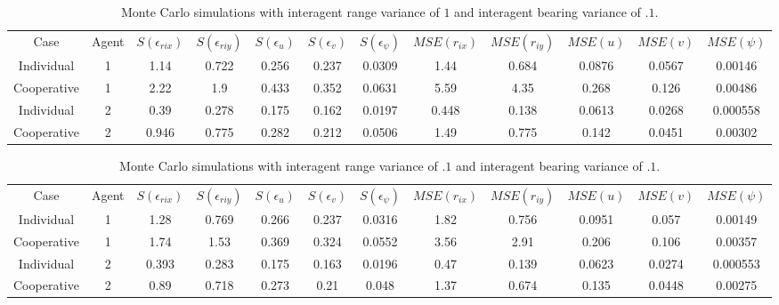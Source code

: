 \documentclass{aiaa-tc}
\begin{document}
\begin{table}[tb!]
\scriptsize
\centering
\begin{tabular}{c|c|c|c|c|c|c|c|c|c|c|c|}
Case & Agent & $S(\epsilon_{rix})$ & $S(\epsilon_{riy})$ & $S(\epsilon_{u})$ & $S(\epsilon_{v})$ & $S(\epsilon_{\psi})$ & $MSE(r_{ix})$ & $MSE(r_{iy})$ & $MSE(u)$ & $MSE(v)$ & $MSE(\psi)$ \\
Individual & 1& 1.14& 0.722& 0.256& 0.237& 0.0309& 1.44& 0.684& 0.0876& 0.0567& 0.00146 \\
Cooperative & 1& 2.22& 1.9& 0.433& 0.352& 0.0631& 5.59& 4.35& 0.268& 0.126& 0.00486 \\
Individual & 2& 0.39& 0.278& 0.175& 0.162& 0.0197& 0.448& 0.138& 0.0613& 0.0268& 0.000558 \\
Cooperative & 2& 0.946& 0.775& 0.282& 0.212& 0.0506& 1.49& 0.775& 0.142& 0.0451& 0.00302 \\
\end{tabular}
\caption{Monte Carlo simulations with interagent range variance of $1$ and interagent bearing variance of $.1$.}
\label{tab:sig_ar1_ab_.1}
\end{table}

\begin{table}[tb!]
\scriptsize
\centering
\begin{tabular}{c|c|c|c|c|c|c|c|c|c|c|c|}
Case & Agent & $S(\epsilon_{rix})$ & $S(\epsilon_{riy})$ & $S(\epsilon_{u})$ & $S(\epsilon_{v})$ & $S(\epsilon_{\psi})$ & $MSE(r_{ix})$ & $MSE(r_{iy})$ & $MSE(u)$ & $MSE(v)$ & $MSE(\psi)$ \\
Individual & 1& 1.28& 0.769& 0.266& 0.237& 0.0316& 1.82& 0.756& 0.0951& 0.057& 0.00149 \\
Cooperative & 1& 1.74& 1.53& 0.369& 0.324& 0.0552& 3.56& 2.91& 0.206& 0.106& 0.00357 \\
Individual & 2& 0.393& 0.283& 0.175& 0.163& 0.0196& 0.47& 0.139& 0.0623& 0.0274& 0.000553 \\
Cooperative & 2& 0.89& 0.718& 0.273& 0.21& 0.048& 1.37& 0.674& 0.135& 0.0448& 0.00275 \\
\end{tabular}
\caption{Monte Carlo simulations with interagent range variance of $.1$ and interagent bearing variance of $.1$.}
\label{tab:sig_ar.1_ab_.1}
\end{table}



\end{document}
